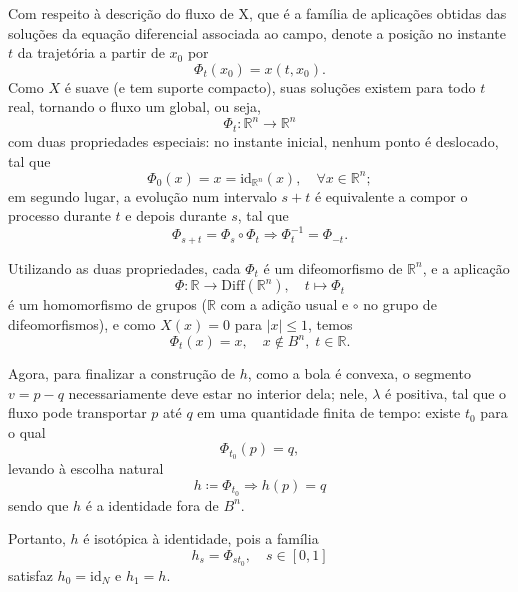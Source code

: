 \documentclass[../differential_topology.tex]{subfiles}
\begin{document}
\begin{proof*}
	Com respeito à descrição do fluxo de X, que é a família de aplicações obtidas das soluções da equação diferencial associada ao campo, denote a posição no instante \(t\) da trajetória a partir de \(x_{0}\) por
	\[
		\Phi_{t}(x_{0}) = x(t, x_{0}).
	\]
	Como \(X\) é suave (e tem suporte compacto), suas soluções existem para todo \(t\) real, tornando o fluxo um global, ou seja,
	\[
		\Phi_{t}:\mathbb{R}^{n}\rightarrow \mathbb{R}^{n}
	\]
	com duas propriedades especiais: no instante inicial, nenhum ponto é deslocado, tal que
	\[
		\Phi_{0}(x) = x = \mathrm{id}_{\mathbb{R}^{n}}(x), \quad \forall x\in \mathbb{R}^{n};
	\]
	em segundo lugar, a evolução num intervalo \(s+t\) é equivalente a compor o processo durante \(t\) e depois durante \(s\), tal que
	\[
		\Phi_{s+t} = \Phi_{s}\circ \Phi_{t} \Rightarrow \Phi_{t}^{-1}=\Phi_{-t}.
	\]

	Utilizando as duas propriedades, cada \(\Phi_{t}\) é um difeomorfismo de \(\mathbb{R}^{n}\), e a aplicação
	\[
		\Phi :\mathbb{R}\rightarrow \mathrm{Diff}(\mathbb{R}^{n}), \quad t\mapsto \Phi_{t}
	\]
	é um homomorfismo de grupos (\(\mathbb{R}\) com a adição usual e \(\circ \) no grupo de difeomorfismos), e como \(X(x) = 0\) para \(| x |\leq 1\), temos
	\[
		\Phi_{t}(x) = x, \quad x\notin B^{n}, \; t\in \mathbb{R}.
	\]

	Agora, para finalizar a construção de \(h\), como a bola é convexa, o segmento \(v=p-q\) necessariamente deve estar no interior dela; nele, \(\lambda \) é positiva, tal que o fluxo pode transportar \(p\) até \(q\) em uma quantidade finita de tempo: existe \(t_{0}\) para o qual
	\[
		\Phi_{t_{0}}(p) = q,
	\]
	levando à escolha natural
	\[
		h\coloneqq \Phi_{t_{0}} \Rightarrow h(p) = q
	\]
	sendo que \(h\) é a identidade fora de \(B^{n}\).

	Portanto, \(h\) é isotópica à identidade, pois a família
	\[
		h_{s} = \Phi_{st_{0}}, \quad s\in [0, 1]
	\]
	satisfaz \(h_{0}=\mathrm{id}_{N}\) e \(h_{1} = h.\) \qedsymbol
\end{proof*}
\end{document}
